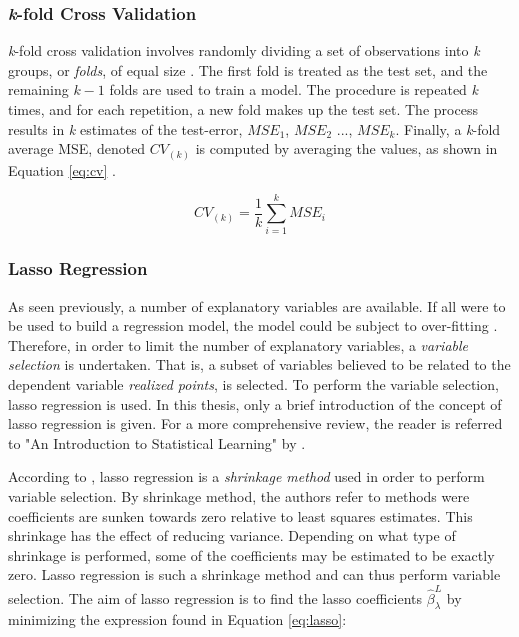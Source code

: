 \subsubsection{\textit{k}-fold Cross Validation}
\textit{k}-fold cross validation involves randomly dividing a set of observations into \textit{k} groups, or \textit{folds}, of equal size \citep{ISLR}. The first fold is treated as the test set, and the remaining $k-1$ folds are used to train a model. The procedure is repeated \textit{k} times, and for each repetition, a new fold makes up the test set. The process results in \textit{k} estimates of the test-error, $MSE_1$, $MSE_2$ ..., $MSE_k$. Finally, a \textit{k}-fold average MSE, denoted $CV_{(k)}$ is computed by averaging the values, as shown in Equation \ref{eq:cv} \citep{ISLR}.

\begin{equation}\label{eq:cv}
    CV_{(k)} = \frac{1}{k}\sum_{i=1}^{k} MSE_i
\end{equation}

\subsubsection{Lasso Regression}

As seen previously, a number of explanatory variables are available. If all were to be used to build a regression model, the model could be subject to over-fitting \citep{ISLR}. Therefore, in order to limit the number of explanatory variables, a \textit{variable selection} is undertaken. That is, a subset of variables believed to be related to the dependent variable \textit{realized points}, is selected. To perform the variable selection, lasso regression is used. In this thesis, only a brief introduction of the concept of lasso regression is given. For a more comprehensive review, the reader is referred to "An Introduction to Statistical Learning" by \cite{ISLR}.

\newpar

According to \cite{ISLR}, lasso regression is a \textit{shrinkage method} used in order to perform variable selection. By shrinkage method, the authors refer to methods were coefficients are sunken towards zero relative to least squares estimates. This shrinkage has the effect of reducing variance. Depending on what type of shrinkage is performed, some of the coefficients may be estimated to be exactly zero. Lasso regression is such a shrinkage method and can thus perform variable selection. The aim of lasso regression is to find the lasso coefficients $\hat{\beta}_{\lambda}^{L}$ by minimizing the expression found in Equation \ref{eq:lasso}:

